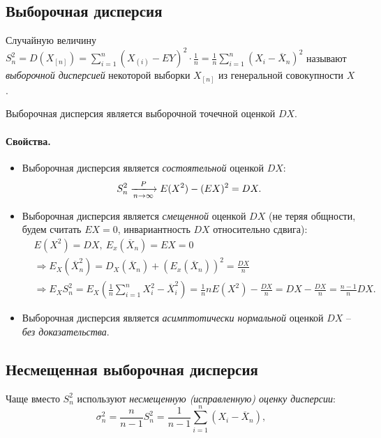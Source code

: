 \subsection{Выборочная дисперсия}

\begin{definition}
  Случайную величину $S^2_n = D(X_{[n]}) =
  \sum\limits_{i = 1}^{n} (X_{(i)} - EY)^2 \cdot \frac{1}{n} =
  \frac{1}{n} \sum\limits_{i = 1}^{n}(X_i - \overline{X}_n)^2$ называют
  \textit{выборочной дисперсией} некоторой выборки $X_{[n]}$ из генеральной
  совокупности $X$.
\end{definition}

Выборочная дисперсия является выборочной точечной оценкой $DX$.

\paragraph{Свойства.}
\begin{itemize}
  \item Выборочная дисперсия является \textit{состоятельной} оценкой $DX$:
  \[
    S^2_n \xlongrightarrow[n \to \infty]{P} E(X^2) - (EX)^2 = DX
  .\]

  \item Выборочная дисперсия является \textit{смещенной} оценкой $DX$ (не теряя
  общности, будем считать $EX = 0$, инвариантность $DX$ относительно сдвига):
  \begin{align*}
    &E(X^2) = DX,~ E_x(\overline{X}_n) = EX = 0\\
    &\Rightarrow E_X(\overline{X}^2_n) =
    D_X(\overline{X}_n) + (E_x(\overline{X}_n))^2 = \frac{DX}{n}\\
    &\Rightarrow E_X S^2_n =
    E_X(\frac{1}{n} \sum\limits_{i = 1}^{n} X^2_i - \overline{X}^2_i) =
    \frac{1}{n} n E(X^2) - \frac{DX}{n} = DX - \frac{DX}{n} =
    \frac{n - 1}{n} DX
  .\end{align*}

  \item Выборочная дисперсия является \textit{асимптотически нормальной}
  оценкой $DX$ -- \textit{без доказательства}.
\end{itemize}



\subsection{Несмещенная выборочная дисперсия}
\begin{definition}
  Чаще вместо $S^2_n$ используют \textit{несмещенную (исправленную) оценку
  дисперсии}:
  \[
    \sigma^2_n = \frac{n}{n - 1} S^2_n =
    \frac{1}{n - 1} \sum\limits_{i = 1}^{n} (X_i - \overline{X}_n)
  ,\]
\end{definition}

